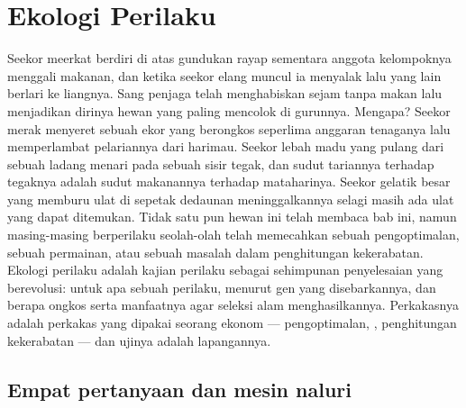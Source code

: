 \chapter{Ekologi Perilaku}\label{ch:b3:behavioural-ecology}

Seekor meerkat berdiri di atas gundukan rayap sementara anggota kelompoknya menggali
makanan, dan ketika seekor elang muncul ia menyalak lalu yang lain berlari ke
liangnya. Sang penjaga telah menghabiskan sejam tanpa makan lalu menjadikan
dirinya hewan yang paling mencolok di gurunnya. Mengapa? Seekor merak menyeret
sebuah ekor yang berongkos seperlima anggaran tenaganya lalu memperlambat pelariannya
dari harimau. Seekor lebah madu yang pulang dari sebuah ladang menari pada sebuah
sisir tegak, dan sudut tariannya terhadap tegaknya adalah sudut
makanannya terhadap mataharinya. Seekor gelatik besar yang memburu ulat di sepetak dedaunan
meninggalkannya selagi masih ada ulat yang dapat ditemukan. Tidak satu pun hewan
ini telah membaca bab ini, namun masing-masing berperilaku seolah-olah telah memecahkan sebuah
pengoptimalan, sebuah permainan, atau sebuah masalah dalam penghitungan kekerabatan. Ekologi
perilaku adalah kajian perilaku sebagai sehimpunan penyelesaian yang berevolusi:
untuk apa sebuah perilaku, menurut gen yang disebarkannya, dan berapa
ongkos serta manfaatnya agar seleksi alam menghasilkannya.
Perkakasnya adalah perkakas yang dipakai seorang ekonom --- pengoptimalan, , penghitungan kekerabatan --- dan ujinya adalah lapangannya.

\section{Empat pertanyaan dan mesin naluri}

